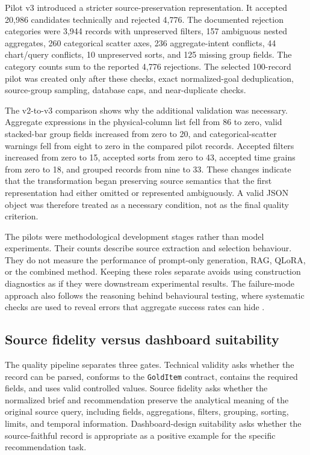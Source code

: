 Pilot v3 introduced a stricter source-preservation representation. It accepted 20,986 candidates technically and rejected 4,776. The documented rejection categories were 3,944 records with unpreserved filters, 157 ambiguous nested aggregates, 260 categorical scatter axes, 236 aggregate-intent conflicts, 44 chart/query conflicts, 10 unpreserved sorts, and 125 missing group fields. The category counts sum to the reported 4,776 rejections. The selected 100-record pilot was created only after these checks, exact normalized-goal deduplication, source-group sampling, database caps, and near-duplicate checks.

The v2-to-v3 comparison shows why the additional validation was necessary. Aggregate expressions in the physical-column list fell from 86 to zero, valid stacked-bar group fields increased from zero to 20, and categorical-scatter warnings fell from eight to zero in the compared pilot records. Accepted filters increased from zero to 15, accepted sorts from zero to 43, accepted time grains from zero to 18, and grouped records from nine to 33. These changes indicate that the transformation began preserving source semantics that the first representation had either omitted or represented ambiguously. A valid JSON object was therefore treated as a necessary condition, not as the final quality criterion.

The pilots were methodological development stages rather than model experiments. Their counts describe source extraction and selection behaviour. They do not measure the performance of prompt-only generation, RAG, QLoRA, or the combined method. Keeping these roles separate avoids using construction diagnostics as if they were downstream experimental results. The failure-mode approach also follows the reasoning behind behavioural testing, where systematic checks are used to reveal errors that aggregate success rates can hide \cite{ribeiro2020checklist}.

\subsection{Source fidelity versus dashboard suitability}

The quality pipeline separates three gates. Technical validity asks whether the record can be parsed, conforms to the \texttt{GoldItem} contract, contains the required fields, and uses valid controlled values. Source fidelity asks whether the normalized brief and recommendation preserve the analytical meaning of the original source query, including fields, aggregations, filters, grouping, sorting, limits, and temporal information. Dashboard-design suitability asks whether the source-faithful record is appropriate as a positive example for the specific recommendation task.

